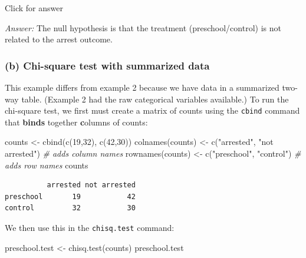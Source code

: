 \documentclass[
]{book}
\newenvironment{Shaded}{\begin{snugshade}}{\end{snugshade}}
\newcommand{\CommentTok}[1]{\textcolor[rgb]{0.56,0.35,0.01}{\textit{#1}}}
\newcommand{\DecValTok}[1]{\textcolor[rgb]{0.00,0.00,0.81}{#1}}
\newcommand{\FunctionTok}[1]{\textcolor[rgb]{0.00,0.00,0.00}{#1}}
\newcommand{\NormalTok}[1]{#1}
\newcommand{\OtherTok}[1]{\textcolor[rgb]{0.56,0.35,0.01}{#1}}
\newcommand{\StringTok}[1]{\textcolor[rgb]{0.31,0.60,0.02}{#1}}
\begin{document}
Click for answer

\emph{Answer:} The null hypothesis is that the treatment (preschool/control) is not related to the arrest outcome.

\hypertarget{b-chi-square-test-with-summarized-data}{%
\subsubsection{(b) Chi-square test with summarized data}\label{b-chi-square-test-with-summarized-data}}

This example differs from example 2 because we have data in a summarized two-way table. (Example 2 had the raw categorical variables available.) To run the chi-square test, we first must create a matrix of counts using the \texttt{cbind} command that \textbf{binds} together \textbf{c}olumns of counts:

\begin{Shaded}
\begin{Highlighting}[]
\NormalTok{counts }\OtherTok{\textless{}{-}} \FunctionTok{cbind}\NormalTok{(}\FunctionTok{c}\NormalTok{(}\DecValTok{19}\NormalTok{,}\DecValTok{32}\NormalTok{), }\FunctionTok{c}\NormalTok{(}\DecValTok{42}\NormalTok{,}\DecValTok{30}\NormalTok{))}
\FunctionTok{colnames}\NormalTok{(counts) }\OtherTok{\textless{}{-}} \FunctionTok{c}\NormalTok{(}\StringTok{"arrested"}\NormalTok{, }\StringTok{"not arrested"}\NormalTok{) }\CommentTok{\# adds column names}
\FunctionTok{rownames}\NormalTok{(counts) }\OtherTok{\textless{}{-}} \FunctionTok{c}\NormalTok{(}\StringTok{"preschool"}\NormalTok{, }\StringTok{"control"}\NormalTok{)  }\CommentTok{\# adds row names}
\NormalTok{counts}
\end{Highlighting}
\end{Shaded}

\begin{verbatim}
          arrested not arrested
preschool       19           42
control         32           30
\end{verbatim}

We then use this in the \texttt{chisq.test} command:

\begin{Shaded}
\begin{Highlighting}[]
\NormalTok{preschool.test }\OtherTok{\textless{}{-}} \FunctionTok{chisq.test}\NormalTok{(counts)}
\NormalTok{preschool.test}
\end{Highlighting}
\end{Shaded}
\end{document}
